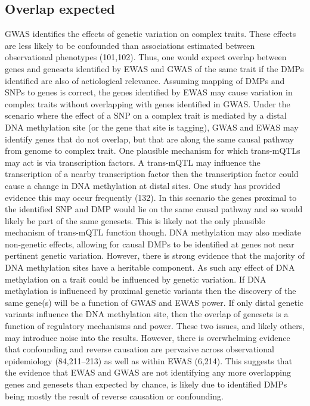 \documentclass[11pt,twoside]{bristolthesis}
\begin{document}
\hypertarget{overlap-expected}{%
\subsection{Overlap expected}\label{overlap-expected}}

GWAS identifies the effects of genetic variation on complex traits. These effects are less likely to be confounded than associations estimated between observational phenotypes (101,102). Thus, one would expect overlap between genes and genesets identified by EWAS and GWAS of the same trait if the DMPs identified are also of aetiological relevance. Assuming mapping of DMPs and SNPs to genes is correct, the genes identified by EWAS may cause variation in complex traits without overlapping with genes identified in GWAS. Under the scenario where the effect of a SNP on a complex trait is mediated by a distal DNA methylation site (or the gene that site is tagging), GWAS and EWAS may identify genes that do not overlap, but that are along the same causal pathway from genome to complex trait. One plausible mechanism for which trans-mQTLs may act is via transcription factors. A trans-mQTL may influence the transcription of a nearby transcription factor then the transcription factor could cause a change in DNA methylation at distal sites. One study has provided evidence this may occur frequently (132). In this scenario the genes proximal to the identified SNP and DMP would lie on the same causal pathway and so would likely be part of the same genesets. This is likely not the only plausible mechanism of trans-mQTL function though. DNA methylation may also mediate non-genetic effects, allowing for causal DMPs to be identified at genes not near pertinent genetic variation. However, there is strong evidence that the majority of DNA methylation sites have a heritable component. As such any effect of DNA methylation on a trait could be influenced by genetic variation. If DNA methylation is influenced by proximal genetic variants then the discovery of the same gene(s) will be a function of GWAS and EWAS power. If only distal genetic variants influence the DNA methylation site, then the overlap of genesets is a function of regulatory mechanisms and power. These two issues, and likely others, may introduce noise into the results. However, there is overwhelming evidence that confounding and reverse causation are pervasive across observational epidemiology (84,211--213) as well as within EWAS (6,214). This suggests that the evidence that EWAS and GWAS are not identifying any more overlapping genes and genesets than expected by chance, is likely due to identified DMPs being mostly the result of reverse causation or confounding.
\end{document}
